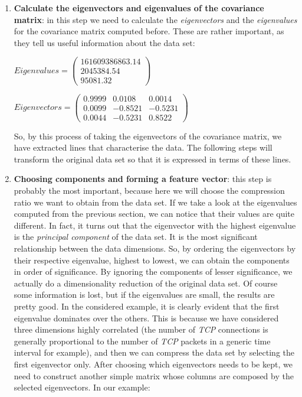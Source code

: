 \documentclass[12pt,a4paper,cucitura]{toptesi}
\begin{document}
\begin{enumerate}
\item \textbf{Calculate the eigenvectors and eigenvalues of the covariance
matrix}: in this step we need to calculate the \emph{eigenvectors} and the \emph{eigenvalues} for the covariance matrix computed before. These are rather important, as they tell us useful information about the data set:

\begin{center}
$Eigenvalues = 
\begin{pmatrix}
161609386863.14 \\
2045384.54 \\
95081.32
\end{pmatrix} $
\end{center}

\begin{center}
$Eigenvectors = 
\begin{pmatrix}
0.9999 & 0.0108 & 0.0014 \\
0.0099 & -0.8521 & -0.5231 \\
0.0044 & -0.5231 & 0.8522  
\end{pmatrix} $
\end{center}

So, by this process of taking the eigenvectors of the covariance matrix, we have extracted lines that characterise the data. The following steps will transform the original data set so that it is expressed in terms of these lines.
\item \textbf{Choosing components and forming a feature vector}: this step is probably the most important, because here we will choose the compression ratio we want to obtain from the data set.
If we take a look at the eigenvalues computed from the previous section, we can notice that their values are quite different. In fact, it turns out that the eigenvector with the highest eigenvalue is the \emph{principal component} of the data set. It is the most significant relationship between the data dimensions. So, by ordering the eigenvectors by their respective eigenvalue, highest to lowest, we can obtain the components in order of significance. By ignoring the components of lesser significance, we actually do a dimensionality reduction of the original data set. Of course some information is lost, but if the eigenvalues are small, the results are pretty good. 
In the considered example, it is clearly evident that the first eigenvalue dominates over the others. This is because we have considered three dimensions highly correlated (the number of \emph{TCP} connections is generally proportional to the number of \emph{TCP} packets in a generic time interval for example), and then we can compress the data set by selecting the first eigenvector only.
After choosing which eigenvectors needs to be kept, we need to construct another simple matrix whose columns are composed by the selected eigenvectors.
In our example:


\end{enumerate}
\end{document}
